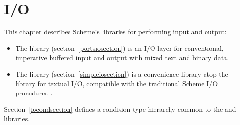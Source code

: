 \chapter{I/O}
\label{iochapter}

This chapter describes Scheme's libraries for performing input and output:

\begin{itemize}
\item The  library
  (section~\ref{portsiosection}) is an I/O layer for conventional,
  imperative buffered input and output with mixed text and binary
  data.
\item The  library
  (section~\ref{simpleiosection}) is a convenience library atop the
   library for textual I/O, compatible with 
  the traditional Scheme I/O procedures~\cite{R5RS}.
\end{itemize}

Section~\ref{iocondsection} defines a condition-type hierarchy common
to the  and 
libraries.






